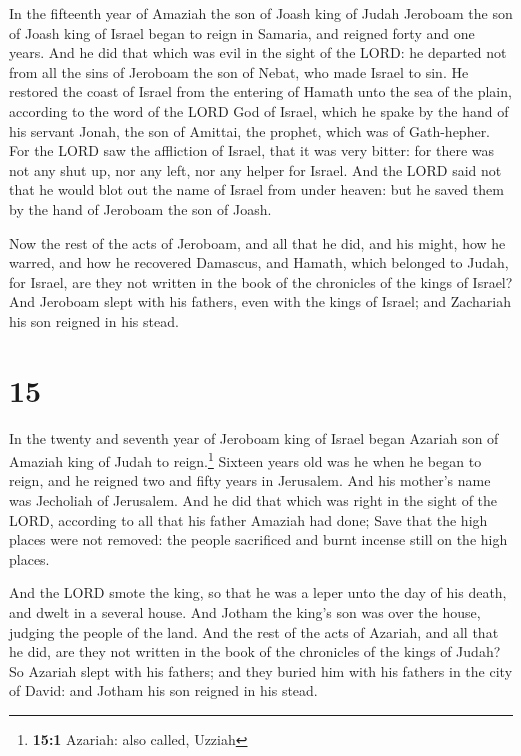  In the fifteenth year of Amaziah the son of Joash king
of Judah Jeroboam the son of Joash king of Israel began to reign in
Samaria, and reigned forty and one years.  And he did
that which was evil in the sight of the LORD: he departed not from all
the sins of Jeroboam the son of Nebat, who made Israel to sin.
 He restored the coast of Israel from the entering of
Hamath unto the sea of the plain, according to the word of the LORD God
of Israel, which he spake by the hand of his servant Jonah, the son of
Amittai, the prophet, which was of Gath-hepher.  For the
LORD saw the affliction of Israel, that it was very bitter: for there
was not any shut up, nor any left, nor any helper for Israel.
 And the LORD said not that he would blot out the name of
Israel from under heaven: but he saved them by the hand of Jeroboam the
son of Joash.

 Now the rest of the acts of Jeroboam, and all that he
did, and his might, how he warred, and how he recovered Damascus, and
Hamath, which belonged to Judah, for Israel, are they not written in the
book of the chronicles of the kings of Israel?  And
Jeroboam slept with his fathers, even with the kings of Israel; and
Zachariah his son reigned in his stead.

\hypertarget{section-14}{%
\section{15}\label{section-14}}

 In the twenty and seventh year of Jeroboam king of Israel
began Azariah son of Amaziah king of Judah to reign.\footnote{\textbf{15:1}
  Azariah: also called, Uzziah}  Sixteen years old was he
when he began to reign, and he reigned two and fifty years in Jerusalem.
And his mother's name was Jecholiah of Jerusalem.  And he
did that which was right in the sight of the LORD, according to all that
his father Amaziah had done;  Save that the high places
were not removed: the people sacrificed and burnt incense still on the
high places.

 And the LORD smote the king, so that he was a leper unto
the day of his death, and dwelt in a several house. And Jotham the
king's son was over the house, judging the people of the land.
 And the rest of the acts of Azariah, and all that he did,
are they not written in the book of the chronicles of the kings of
Judah?  So Azariah slept with his fathers; and they buried
him with his fathers in the city of David: and Jotham his son reigned in
his stead.

